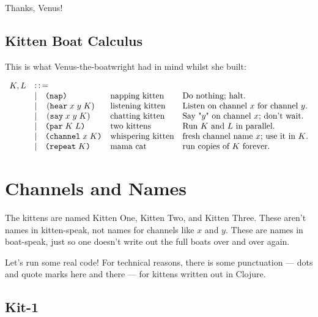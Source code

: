 \documentclass[10pt,oneside,x11names]{article}
\newcommand{\Coloneqq}{\mathrel{\vcenter{\hbox{$:\,:\,=$}}{}}}
\theoremstyle{definition}
\theoremstyle{warning}
\newcommand\say [3]{\left(\texttt{say}\thickspace{}#1\thickspace{}#2\thickspace{}#3\right)}
\newcommand\hear[3]{\left(\texttt{hear}\thickspace{}#1\thickspace{}#2\thickspace{}#3\right)}
\newcommand\knapping    [0]{\texttt{(nap)}}
\newcommand\kpar        [2]{\texttt{(par}\thickspace{}#1\thickspace{}#2\texttt{)}}
\newcommand\kwhispering [2]{\texttt{(channel}\thickspace{}#1\thickspace{}#2\texttt{)}}
\newcommand\kmama       [1]{\texttt{(repeat}\thickspace{}#1\texttt{)}}
\begin{document}
Thanks, Venus!

\subsection{Kitten Boat Calculus}
\label{sec:orgb6a0d8f}

This is what Venus-the-boatwright had in mind whilst she built:

\begin{equation}
\begin{array}{clll}
  K, L & \Coloneqq \\
       & | \quad \knapping            & \textrm{napping kitten}    & \textrm{Do nothing; halt.}                                   \\
       & | \quad \hear{x}{y}{K}       & \textrm{listening kitten}  & \textrm{Listen on channel }x\textrm{ for channel }y.         \\
       & | \quad \say{x}{y}{K}        & \textrm{chatting kitten}   & \textrm{Say "}y\textrm{" on channel }x\textrm{; don't wait.} \\
       & | \quad \kpar{K}{L}          & \textrm{two kittens}       & \textrm{Run }K\textrm{ and }L\textrm{ in parallel.}          \\
       & | \quad \kwhispering{x}{K}   & \textrm{whispering kitten} & \textrm{fresh channel name }x\textrm{; use it in }K\textrm{.}\\
       & | \quad \kmama{K}            & \textrm{mama cat}          & \textrm{run copies of }K\textrm{ forever}\textrm{.}          \\
\end{array}
\end{equation}

\section{Channels and Names}
\label{sec:org4343192}

The kittens are named Kitten One, Kitten Two, and Kitten
Three. These aren't names in kitten-speak, not names for
channels like \(x\) and \(y\). These are names in boat-speak, just
so one doesn't write out the full boats over and over again.

Let's run some real code! For technical reasons, there is some
punctuation --- dots and quote marks here and there --- for
kittens written out in Clojure.

\subsection{Kit-1}
\label{sec:orgcc128ea}
\end{document}

